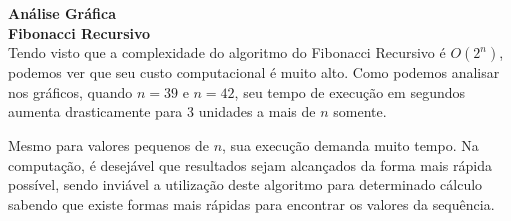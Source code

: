 \documentclass[a4paper, 12pt]{article}
\begin{document}
\newpage

{\LARGE\bf Análise Gráfica}\\

{\Large\bf Fibonacci Recursivo}\\

Tendo visto que a complexidade do algoritmo do Fibonacci Recursivo é $O(2^n)$, podemos ver que seu custo computacional é muito alto. Como podemos analisar nos gráficos, quando $n=39$ e $n=42$, seu tempo de execução em segundos aumenta drasticamente para 3 unidades a mais de $n$ somente.

Mesmo para valores pequenos de $n$, sua execução demanda muito tempo. Na computação, é desejável que resultados sejam alcançados da forma mais rápida possível, sendo inviável a utilização deste algoritmo para determinado cálculo sabendo que existe formas mais rápidas para encontrar os valores da sequência.
\end{document}

